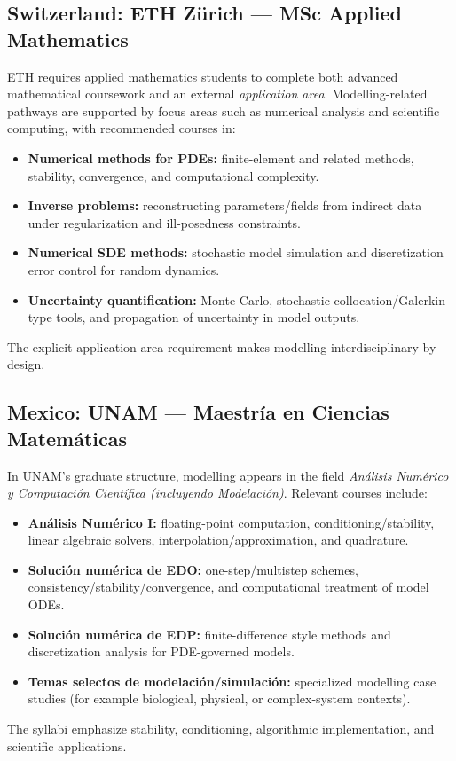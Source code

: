 ﻿\documentclass[11pt,a4paper]{article}
\begin{document}
\subsection*{Switzerland: ETH Z\"urich --- MSc Applied Mathematics}
ETH requires applied mathematics students to complete both advanced mathematical coursework and an external \emph{application area}. Modelling-related pathways are supported by focus areas such as numerical analysis and scientific computing, with recommended courses in:
\begin{itemize}[leftmargin=*]
  \item \textbf{Numerical methods for PDEs:} finite-element and related methods, stability, convergence, and computational complexity.
  \item \textbf{Inverse problems:} reconstructing parameters/fields from indirect data under regularization and ill-posedness constraints.
  \item \textbf{Numerical SDE methods:} stochastic model simulation and discretization error control for random dynamics.
  \item \textbf{Uncertainty quantification:} Monte Carlo, stochastic collocation/Galerkin-type tools, and propagation of uncertainty in model outputs.
\end{itemize}
The explicit application-area requirement makes modelling interdisciplinary by design.

\subsection*{Mexico: UNAM --- Maestr\'ia en Ciencias Matem\'aticas}
In UNAM's graduate structure, modelling appears in the field \emph{An\'alisis Num\'erico y Computaci\'on Cient\'ifica (incluyendo Modelaci\'on)}. Relevant courses include:
\begin{itemize}[leftmargin=*]
  \item \textbf{An\'alisis Num\'erico I:} floating-point computation, conditioning/stability, linear algebraic solvers, interpolation/approximation, and quadrature.
  \item \textbf{Soluci\'on num\'erica de EDO:} one-step/multistep schemes, consistency/stability/convergence, and computational treatment of model ODEs.
  \item \textbf{Soluci\'on num\'erica de EDP:} finite-difference style methods and discretization analysis for PDE-governed models.
  \item \textbf{Temas selectos de modelaci\'on/simulaci\'on:} specialized modelling case studies (for example biological, physical, or complex-system contexts).
\end{itemize}
The syllabi emphasize stability, conditioning, algorithmic implementation, and scientific applications.
\end{document}
